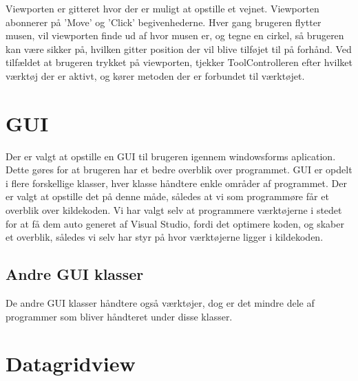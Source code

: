 \vspace{5mm}

Viewporten er gitteret hvor der er muligt at opstille et vejnet. Viewporten abonnerer på 'Move' og 'Click' begivenhederne. Hver gang brugeren flytter musen, vil viewporten finde ud af hvor musen er, og tegne en cirkel, så brugeren kan være sikker på, hvilken gitter position der vil blive tilføjet til på forhånd. Ved tilfældet at brugeren trykket på viewporten, tjekker ToolControlleren efter hvilket værktøj der er aktivt, og kører metoden der er forbundet til værktøjet.

\vspace{5mm}

\section{GUI}
Der er valgt at opstille en GUI til brugeren igennem windowsforms aplication. Dette gøres for at brugeren har et bedre overblik over programmet. GUI er opdelt i flere forskellige klasser, hver klasse håndtere enkle områder af programmet. Der er valgt at opstille det på denne måde, således at vi som programmøre får et overblik over kildekoden. Vi har valgt selv at programmere værktøjerne i stedet for at få dem auto generet af Visual Studio, fordi det optimere koden, og skaber et overblik, således vi selv har styr på hvor værktøjerne ligger i kildekoden.

\subsection{Andre GUI klasser}
De andre GUI klasser håndtere også værktøjer, dog er det mindre dele af programmer som bliver håndteret under disse klasser. 

\section{Datagridview}
